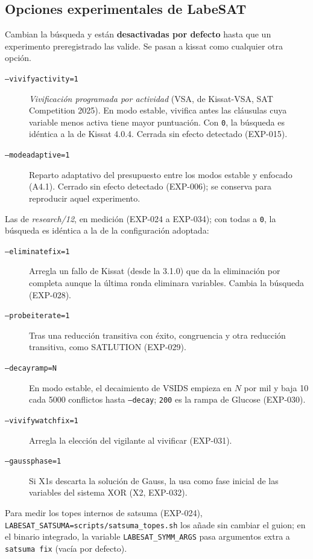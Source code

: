 \documentclass[11pt,a4paper]{article}
\begin{document}
\subsection{Opciones experimentales de LabeSAT}
Cambian la búsqueda y están \textbf{desactivadas por defecto} hasta que un
experimento preregistrado las valide. Se pasan a kissat como cualquier otra
opción.
\begin{description}
  \item[\texttt{--vivifyactivity=1}] \emph{Vivificación programada por
        actividad} (VSA, de Kissat-VSA, SAT Competition 2025). En modo estable,
        vivifica antes las cláusulas cuya variable menos activa tiene mayor
        puntuación. Con \texttt{0}, la búsqueda es idéntica a la de Kissat
        4.0.4. Cerrada sin efecto detectado (EXP-015).
  \item[\texttt{--modeadaptive=1}] Reparto adaptativo del presupuesto entre
        los modos estable y enfocado (A4.1). Cerrado sin efecto detectado
        (EXP-006); se conserva para reproducir aquel experimento.
\end{description}
Las de \emph{research/12}, en medición (EXP-024 a EXP-034); con todas a
\texttt{0}, la búsqueda es idéntica a la de la configuración adoptada:
\begin{description}
  \item[\texttt{--eliminatefix=1}] Arregla un fallo de Kissat (desde la
        3.1.0) que da la eliminación por completa aunque la última ronda
        eliminara variables. Cambia la búsqueda (EXP-028).
  \item[\texttt{--probeiterate=1}] Tras una reducción transitiva con éxito,
        congruencia y otra reducción transitiva, como SATLUTION (EXP-029).
  \item[\texttt{--decayramp=N}] En modo estable, el decaimiento de VSIDS
        empieza en $N$ por mil y baja 10 cada 5000 conflictos hasta
        \texttt{--decay}; \texttt{200} es la rampa de Glucose (EXP-030).
  \item[\texttt{--vivifywatchfix=1}] Arregla la elección del vigilante al
        vivificar (EXP-031).
  \item[\texttt{--gaussphase=1}] Si X1s descarta la solución de Gauss, la
        usa como fase inicial de las variables del sistema XOR (X2, EXP-032).
\end{description}
Para medir los topes internos de satsuma (EXP-024),
\texttt{LABESAT\_SATSUMA=scripts/satsuma\_topes.sh} los añade sin cambiar el
guion; en el binario integrado, la variable \texttt{LABESAT\_SYMM\_ARGS} pasa
argumentos extra a \texttt{satsuma fix} (vacía por defecto).
\end{document}
